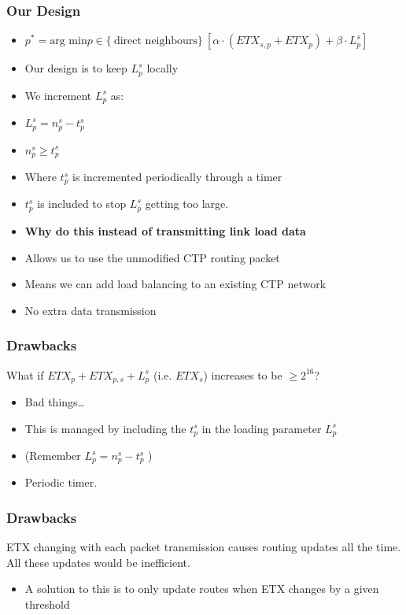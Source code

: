 \documentclass{beamer}
\begin{document}
\begin{frame}
  \frametitle{Our Design}
  \begin{itemize}
    \item $p^* = \text{arg min}  p \in \{\ \text{direct neighbours} \}\
      [\alpha  \cdot (ETX_{s,p} + ETX_p) + \beta \cdot L_p^s]$

    \item Our design is to keep $L_p^s$ locally 
    \item We increment $L_p^s$ as:
    \item $L_p^s = n_p^s - t_p^s$
    \item $n_p^s \geq t_p^s$
    \item Where $t_p^s$ is incremented periodically through a timer
    \item $t_p^s$ is included to stop $L_p^s$ getting too large.
    \item \textbf{Why do this instead of transmitting link load data}
    \item Allows us to use the unmodified CTP routing packet
    \item Means we can add load balancing to an existing CTP network
    \item No extra data transmission
  \end{itemize}

\end{frame}

\begin{frame}
  \frametitle{Drawbacks}
    What if $ETX_p + ETX_{p,s} + L_p^s$ (i.e. $ETX_s$) increases to be $\geq 2^{16}$?
  \begin{itemize}
    \item Bad things\ldots
    \item This is managed by including the $t_p^s$ in the loading parameter
    $L_p^s$
    \item (Remember $L_p^s = n_p^s - t_p^s$ )
    \item Periodic timer.
  \end{itemize}
\end{frame}  



\begin{frame}
  \frametitle{Drawbacks}
    ETX changing with each packet transmission causes routing updates all the
    time. All these updates would be inefficient.
  \begin{itemize}
    \item A solution to this is to only update routes when ETX changes by a given
    threshold
    \end{itemize}
\end{frame}  
\end{document}
